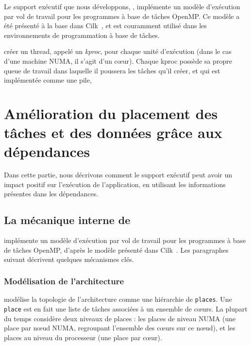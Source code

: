 \documentclass[parallelisme]{compas2016}
\begin{document}
Le support exécutif que nous développons, \kaapi, implémente un modèle d'exécution par vol
de travail pour les programmes à base de tâches OpenMP. Ce modèle a été présenté
à la base dans Cilk~\cite{cilk5}, et est couramment utilisé dans les environnements
de programmation à base de tâches.

\kaapi créer un thread, appelé un \emph{kproc}, pour chaque unité d'exécution
(dans le cas d'une machine NUMA, il s'agit d'un cœur).
Chaque kproc possède sa propre queue de travail dans laquelle il poussera les
tâches qu'il créer, et qui est implémentée comme une pile,




\vspace*{-1ex}
\section{Amélioration du placement des tâches et des données grâce aux dépendances}
\label{sec:contributions}

Dans cette partie, nous décrivons comment le support exécutif peut avoir un impact
positif sur l'exécution de l'application, en utilisant les informations présentes
dans les dépendances.


\vspace*{-1ex}
\subsection{La mécanique interne de \kaapi}

\kaapi implémente un modèle d'exécution par vol de travail pour les programmes
à base de tâches OpenMP, d'après le modèle présenté dans Cilk~\cite{cilk5}.
Les paragraphes suivant décrivent quelques mécanismes clés.


\vspace*{-1ex}
\subsubsection{Modélisation de l'architecture}

\kaapi modélise la topologie de l'architecture comme une hiérarchie de \verb/places/.
Une \verb/place/ est en fait une liste de tâches associées à un ensemble de cœurs.
La plupart du temps \kaapi considère deux niveaux de places : les places de niveau
NUMA (une place par nœud NUMA, regroupant l'ensemble des cœurs sur ce nœud),
et les places au niveau du processeur (une place par cœur).


\vspace*{-1ex}
\end{document}
